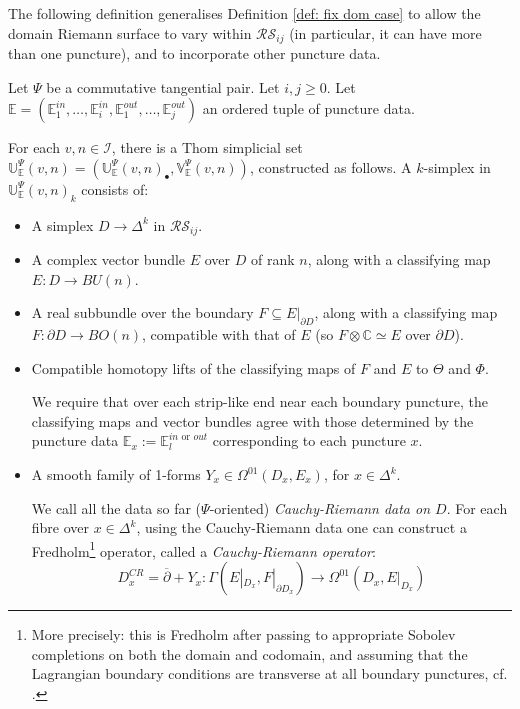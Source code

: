 \documentclass{TPmod}
\def\bC{\mathbb{C}}
\def\bE{\mathbb{E}}
\def\bU{\mathbb{U}}
\def\bV{\mathbb{V}}
\newcommand{\cI}{\mathcal{I}}
\newcommand{\cR}{\mathcal{R}}
\newcommand{\cS}{\mathcal{S}}
\numberwithin{equation}{section}
\begin{document}
    The following definition generalises Definition \ref{def: fix dom case} to allow the domain Riemann surface to vary within $\cR\cS_{ij}$ (in particular, it can have more than one puncture), and to incorporate other puncture data. 
    \begin{defn}\label{def: big abst disc defn}
        Let $\Psi$ be a commutative tangential pair. Let $i, j \geq 0$. Let $\bE=(\bE^{in}_1, \ldots, \bE^{in}_i, \bE^{out}_1, \ldots, \bE^{out}_j)$ an ordered tuple of puncture data.
    
        For each $v, n \in \cI$, there is a Thom simplicial set $\bU_{\bE}^{\Psi}(v,n)=(\bU^{\Psi}_{\bE}(v,n)_\bullet, \bV^{\Psi}_{\bE}(v,n))$, constructed as follows. A $k$-simplex in $\bU^{\Psi}_{\bE}(v,n)_k$ consists of:
        \begin{itemize}
            \item A simplex $D \to \Delta^k$ in $\cR\cS_{ij}$.
            \item A complex vector bundle $E$ over $D$ of rank $n$, along with a classifying map $E: D \to BU(n)$.
            \item A real subbundle over the boundary $F \subseteq E|_{\partial D}$, along with a classifying map $F: \partial D \to BO(n)$, compatible with that of $E$ (so $F \otimes \bC \simeq E$ over $\partial D$). 
            \item Compatible homotopy lifts of the classifying maps of $F$ and $E$ to $\Theta$ and $\Phi$.

            We require that over each strip-like end near each boundary puncture, the classifying maps and vector bundles agree with those determined by the puncture data $\bE_x := \bE_l^{in \textrm{ or }out}$ corresponding to each puncture $x$.
            \item A smooth family of 1-forms $Y_x \in \Omega^{01}(D_x, E_x)$, for $x \in \Delta^k$.
    
            We call all the data so far ($\Psi$-oriented) \emph{Cauchy-Riemann data on $D$}. For each fibre over $x \in \Delta^k$, using the Cauchy-Riemann data one can construct a Fredholm\footnote{More precisely: this is Fredholm after passing to appropriate Sobolev completions on both the domain and codomain,  and assuming that the Lagrangian boundary conditions are transverse at all boundary punctures, cf. \cite[Definition 3.10]{PS2}.} operator, called a \emph{Cauchy-Riemann operator}:
            \begin{equation}
                D^{CR}_x = \overline \partial + Y_x: \Gamma(E|_{D_x}, F|_{\partial D_x}) \to \Omega^{01}(D_x, E|_{D_x})
            \end{equation}
            

\end{itemize}
\end{defn}
\end{document}
